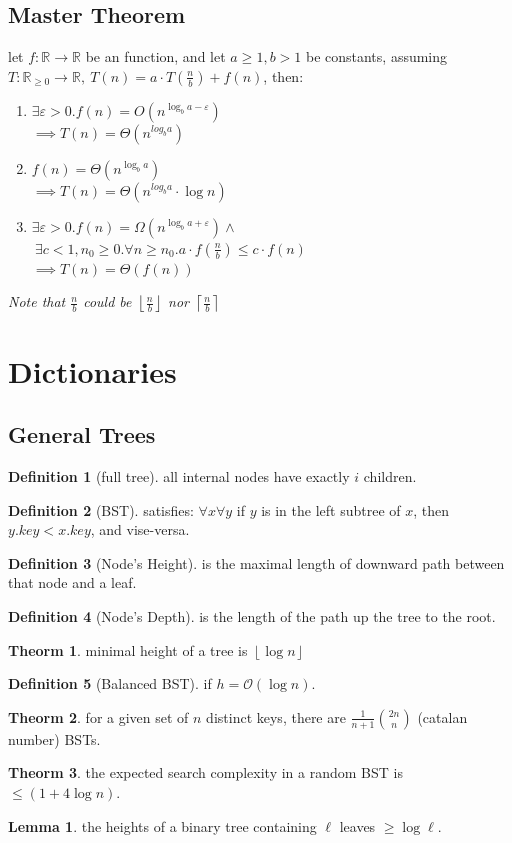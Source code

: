 \documentclass[]{article}
\newcommand\compactsubsection[1]        {\vspace{-10pt}\subsection{#1}\vspace{-6pt}}
\newcommand\compactsection   [1]        {\vspace{-10pt}\section{#1}\vspace{-6pt}}
\newcommand\subsectionrightaftersection {\vspace{10pt}}
\theoremstyle{definition}
\newtheorem{Theorem}{\color{theoColor}Theorm}
\newtheorem{Definition}{\color{defiColor}Definition}
\newtheorem{Lemma}{\color{lemColor}Lemma}
\newcommand\theo  [1] {\begin{Theorem}#1\end{Theorem}}
\newcommand\lem   [1] {\begin{Lemma}#1\end{Lemma}}
\newcommand\R     {\mathbb{R}}
\newcommand\oc    {\mathcal{O}}
\newcommand\vepsi {\varepsilon}
\newcommand\rc    {\right\rceil}
\newcommand\lc    {\left\lceil}
\newcommand\rf    {\right\rfloor}
\newcommand\lf    {\left\lfloor}
\newcommand\floor [1] {\lf #1 \rf}
\newcommand\logn      {\log n}
\begin{document}
\begin{multicols}{4}
			\compactsubsection{Master Theorem}
				let $ f \colon \R \to \R $ be an function, and let $ a \ge 1, b > 1 $ be constants, assuming $ T \colon \R_{\ge 0} \to \R, \ T(n) = a \cdot T\left (\tfrac{n}{b} \right ) + f(n)$, then: 
				\begin{enumerate}
					\item $ \exists \vepsi > 0. f(n) = O(n^{\log_b a - \vepsi}) $ \\ $\implies T(n) = \Theta(n^{log_b a}) $
					\item $ f(n) = \Theta(n^{\log_b a}) $ \\ $\implies T(n) = \Theta(n^{log_b a} \cdot \logn) $
					\item $ \exists \vepsi > 0. f(n) = \Omega(n^{\log_b a + \vepsi}) \land $ \\
					$\ \exists c < 1, n_0 \ge 0. \forall n \ge n_0. a \cdot f(\tfrac{n}{b}) \le c \cdot f(n) $ \\
					$\implies T(n) = \Theta(f(n)) $
				\end{enumerate}
				\textit{Note that $ \mathit{\tfrac{n}{b}} $ could be $ \mathit{\lf \tfrac{n}{b} \rf} $ nor $ \mathit{\lc \tfrac{n}{b} \rc} $}
		
		\vspace{-3pt}				
		\compactsection{Dictionaries}\subsectionrightaftersection
			\compactsubsection{General Trees}
				\begin{Definition}[full tree]
					all internal nodes have exactly $i$ children. 
				\end{Definition}
				\begin{Definition}[BST]
					satisfies: $\forall x \forall y$ if $y$ is in the left subtree of $x$, then $y.key < x.key$, and vise-versa. 
				\end{Definition}
				\begin{Definition}[Node's Height]
					is the maximal length of downward path between that node and a leaf. 
				\end{Definition}
				\begin{Definition}[Node's Depth]
					is the length of the path up the tree to the root. 
				\end{Definition}
				\theo{minimal height of a tree is $\floor{\log n}$}
				\begin{Definition}[Balanced BST]
					if $h = \oc(\logn)$. 
				\end{Definition}
				\theo{for a given set of $n$ distinct keys, there are $\frac{1}{n + 1}\binom{2n}{n}$ (catalan number) BSTs. }
				\theo{the expected search complexity in a random BST is $\le (1 + 4 \logn)$. }
				\lem{the heights of a binary tree containing $\ell$ leaves $\ge \log \ell$. }
				

\end{multicols}
\end{document}
